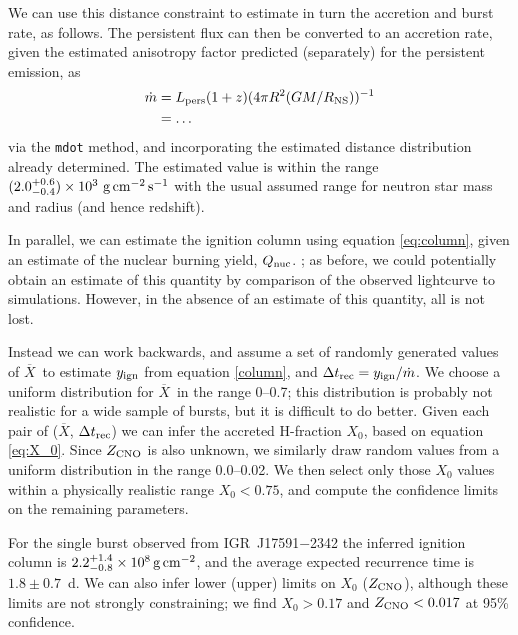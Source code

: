 \documentclass{aastex63}
\newcommand{\Xb}{\ensuremath{\overline{X}}}
\newcommand{\qnuc}{Q_{\rm nuc}}
\newcommand{\yign}{y_{\rm ign}}
\begin{document}
We can use this distance constraint to estimate in turn the accretion and burst rate, as follows.
%
The persistent flux can then be converted to an accretion rate, given the estimated anisotropy factor predicted (separately) for the persistent emission, as
\begin{eqnarray}
\dot{m} & = L_{\rm pers} (1+z) (4\pi R^2(GM/R_{\rm NS}))^{-1}\\
& = \ldots
\end{eqnarray}
via the {\tt mdot} method, and incorporating the estimated distance distribution already determined. The estimated value is within the range $(2.0_{-0.4}^{+0.6})\times10^3\ \rm{g\,cm^{-2}\,s^{-1}}$ with the usual assumed range for neutron star mass and radius (and hence redshift).

In parallel, we can estimate the ignition column using equation \ref{eq:column}, given an estimate of the nuclear burning yield, $\qnuc$. ; as before, we could potentially obtain an estimate of this quantity by comparison of the observed lightcurve to simulations. However, in the absence of an estimate of this quantity, all is not lost. 

Instead we can work backwards, 
% 
and assume a set of randomly generated values of \Xb\
to estimate $\yign$ from equation \ref{column}, and $\Delta t_{\rm rec} = \yign/\dot{m}$.
%
We choose a uniform distribution for \Xb\ in the range 0--0.7; this distribution is probably not realistic for a wide sample of bursts, but it is difficult to do better.
Given each pair of (\Xb,  $\Delta t_{\rm rec}$) we can infer the accreted H-fraction $X_0$, based on 
equation \ref{eq:X_0}.
%
Since $Z_{\rm CNO}$ is also unknown, we similarly draw random values from a uniform distribution in the range 0.0--0.02.
We then select only those $X_0$ values within a physically realistic range $X_0<0.75$, and compute the confidence limits on the remaining parameters. 

For the single burst observed from IGR~J17591$-$2342 the inferred ignition column is $2.2_{-0.8}^{+1.4}\times10^8\,{\rm g\,cm^{-2}}$, and the average expected recurrence time is $1.8\pm0.7$~d. 
We can also infer lower (upper) limits on $X_0$ ($Z_{\rm CNO}$), although these limits are not strongly constraining; we find $X_0>0.17$ and $Z_{\rm  CNO}<0.017$ at 95\% confidence.
\end{document}

